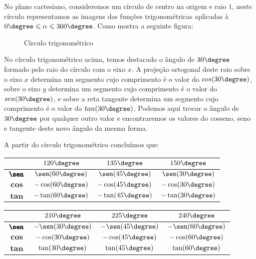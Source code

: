 No plano cartesiano, consideremos um círculo de centro na origem e raio $1$, neste círculo representamos as imagens das funções trigonométricas aplicadas à  $0 \degree \leqslant \alpha \leqslant 360 \degree$. Como mostra a seguinte figura:
 \begin{figure}[H]
   \centering
   \caption{Círculo trigonométrico}
  \end{figure}

 No círculo trigonométrico acima, temos destacado o ângulo de $30 \degree$ formado pelo raio do círculo com o eixo $x$. A projeção ortogonal deste raio sobre o eixo $x$ determina um segmento cujo comprimento é o valor do $cos(30 \degree)$, sobre o eixo $y$ determina um segmento cujo comprimento é o valor do $sen(30 \degree)$, e sobre a reta tangente determina um segmento cujo comprimento é o valor da $tan(30 \degree)$. Podemos aqui trocar o ângulo de $30 \degree$ por qualquer outro valor e encontraremos os valores do cosseno, seno e tangente deste novo ângulo da mesma forma.
 
  A partir do círculo trigonométrico concluímos que:

  \begin{table}[H]
 \centering
 \begin{tabular}{|c|c|c|c|} \hline
 \rowcolor{cinza}
               &  $120\degree$  & $135\degree$  &  $150\degree$ \\\hline
  $\pmb{\sen}$ & $\sen(60\degree)$ &$\sen(45\degree)$ & $\sen(30\degree)$  \\\hline
  $\pmb{\cos}$ & $-\cos(60\degree)$ &$-\cos(45\degree)$ & $-\cos(30\degree)$  \\\hline
  $\pmb{\tan}$ & $-\tan(60\degree)$ &$-\tan(45\degree)$ & $-\tan(30\degree)$  \\\hline
 \end{tabular}
\end{table}

 \begin{table}[H]
 \centering
 \begin{tabular}{|c|c|c|c|} \hline
 \rowcolor{cinza}
                & $210\degree$ & $225\degree$  & $240\degree$  \\\hline
  $\pmb{\sen}$ &  $-\sen(30\degree)$ & $-\sen(45\degree)$ & $-\sen(60\degree)$  \\\hline
  $\pmb{\cos}$ &  $-\cos(30\degree)$ & $-\cos(45\degree)$ & $-\cos(60\degree)$  \\\hline
  $\pmb{\tan}$ &  $\tan(30\degree)$ & $\tan(45\degree)$ & $\tan(60\degree)$   \\\hline
 \end{tabular}
\end{table}

